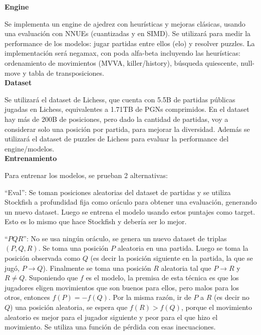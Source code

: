 \textbf{Engine}

Se implementa un engine de ajedrez con heurísticas y mejoras clásicas, usando una evaluación con NNUEs (cuantizadas y en SIMD). Se utilizará para medir la performance de los modelos: jugar partidas entre ellos (elo) y resolver puzzles.
La implementación será negamax, con poda alfa-beta incluyendo las heurísticas: ordenamiento de movimientos (MVVA, killer/history), búsqueda quiescente, null-move y tabla de transposiciones. \\

\textbf{Dataset}

Se utilizará el dataset de Lichess, que cuenta con 5.5B de partidas públicas jugadas en Lichess, equivalentes a 1.71TB de PGNs comprimidos. En el dataset hay más de 200B de posiciones, pero dado la cantidad de partidas, voy a considerar solo una posición por partida, para mejorar la diversidad. Además se utilizará el dataset de puzzles de Lichess para evaluar la performance del engine/modelos. \\

\textbf{Entrenamiento}

Para entrenar los modelos, se prueban 2 alternativas:

``Eval'': Se toman posiciones aleatorias del dataset de partidas y se utiliza Stockfish a profundidad fija como oráculo para obtener una evaluación, generando un nuevo dataset. Luego se entrena el modelo usando estos puntajes como target. Esto es lo mismo que hace Stockfish y debería ser lo mejor.

``$PQR$'': No se usa ningún oráculo, se genera un nuevo dataset de triplas $(P,Q,R)$. Se toma una posición $P$ aleatoria en una partida. Luego se toma la posición observada como $Q$ (es decir la posición siguiente en la partida, la que se jugó, $P \rightarrow Q$). Finalmente se toma una posición $R$ aleatoria tal que $P \rightarrow R$ y $R \neq Q$. Suponiendo que $f$ es el modelo, la premisa de esta técnica es que los jugadores eligen movimientos que son buenos para ellos, pero malos para los otros, entonces $f(P)=-f(Q)$. Por la misma razón, ir de $P$ a $R$ (es decir no $Q$) una posición aleatoria, se espera que $f(R) > f(Q)$, porque el movimiento aleatorio es mejor para el jugador siguiente y peor para el que hizo el movimiento. Se utiliza una función de pérdida con esas inecuaciones.
